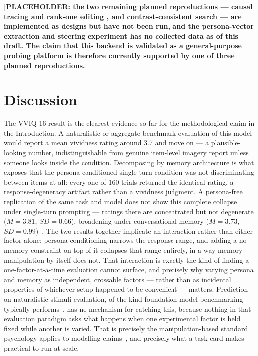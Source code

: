 \documentclass[pdflatex,sn-nature]{sn-jnl}
\begin{document}
\textbf{[PLACEHOLDER: the two remaining planned reproductions — causal
tracing and rank-one editing \citep{meng2022rome}, and contrast-consistent
search \citep{burns2023ccs} — are implemented as designs but have not been
run, and the persona-vector extraction and steering experiment
\citep{chen2025personavectors} has no collected data as of this draft. The
claim that this backend is validated as a general-purpose probing platform
is therefore currently supported by one of three planned reproductions.]}

\section{Discussion}\label{sec:discussion}

The VVIQ-16 result is the clearest evidence so far for the methodological
claim in the Introduction. A naturalistic or aggregate-benchmark evaluation
of this model would report a mean vividness rating around 3.7 and move on
--- a plausible-looking number, indistinguishable from genuine item-level
imagery report unless someone looks inside the condition. Decomposing by
memory architecture is what exposes that the persona-conditioned
single-turn condition was not discriminating between items at all: every
one of 160 trials returned the identical rating, a response-degeneracy
artifact rather than a vividness judgment. A persona-free replication of
the same task and model does not show this complete collapse under
single-turn prompting --- ratings there are concentrated but not
degenerate ($M=3.81$, $SD=0.66$), broadening under conversational memory
($M=3.73$, $SD=0.99$)~\citep{ranjan2025psychological}. The two results
together implicate an interaction rather than either factor alone: persona
conditioning narrows the response range, and adding a no-memory constraint
on top of it collapses that range entirely, in a way memory manipulation
by itself does not. That interaction is exactly the kind of finding a
one-factor-at-a-time evaluation cannot surface, and precisely why varying
persona and memory as independent, crossable factors --- rather than as
incidental properties of whichever setup happened to be convenient ---
matters. Prediction-on-naturalistic-stimuli evaluation, of the kind
foundation-model benchmarking typically performs~\citep{binz2025foundation},
has no mechanism for catching this, because nothing in that evaluation
paradigm asks what happens when one experimental factor is held fixed
while another is varied. That is precisely the manipulation-based standard
psychology applies to modelling claims~\citep{bowers2023deepproblems}, and
precisely what a task card makes practical to run at
scale.
\end{document}
